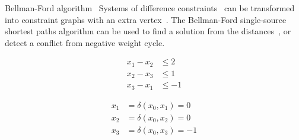 \documentclass{beamer}
\begin{document}
\begin{frame}[fragile,t]
\begin{columns}[t,onlytextwidth]
\begin{column}{0.485\textwidth}
		\begin{block}{Bellman-Ford algorithm~\cite{CLRS}}
			Systems of difference constraints~ can be transformed into constraint graphs with an extra vertex~. The Bellman-Ford single-source shortest paths algorithm can be used to find a solution from the distances~, or detect a conflict from negative weight cycle.
			\vspace*{-1em}
			\begin{figure}[h]
				\centering
				\begin{subfigure}[t]{0.3\linewidth}
					\centering
					\begin{align*}
						x_1 - x_2 &\leq 2 \\
						x_2 - x_3 &\leq 1 \\
						x_3 - x_1 &\leq -1
					\end{align*}
					\label{subfig:constraints}
				\end{subfigure}
				\begin{subfigure}[t]{0.4\linewidth}
					\centering
					\label{subfig:graph}
				\end{subfigure}
				\begin{subfigure}[t]{0.2\linewidth}
					\centering
					\begin{align*}
						x_1 &= \delta(x_0, x_1) = 0 \\
						x_2 &= \delta(x_0, x_2) = 0 \\
						x_3 &= \delta(x_0, x_3) = -1
					\end{align*}
					\label{subfig:solution}
				\end{subfigure}
			\end{figure}
			\vspace*{-1.5em}


\end{block}
\end{column}
\end{columns}
\end{frame}
\end{document}
